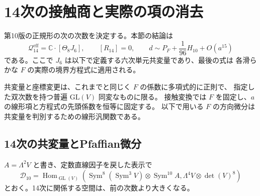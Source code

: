 \clearpage
\section{14次の接触商と実際の項の消去}
\label{sec:contact-fourteen}

第10版の正規形の次の次数を決定する。本節の結論は
\[
 \mathcal Q^{\mathrm{eff}}_{14}=\mathbb C\cdot[\Theta_8J_6],\qquad
 [R_{14}]=0,\qquad
 d\sim P_F+\frac1{96}H_{10}+O(a^{15})
\]
である。ここで $J_6$ は以下で定義する六次単元共変量であり、最後の式は
各滑らかな $F$ の実際の境界方程式に適用される。

共変量と座標変更は、これまでと同じく $F$ の係数に多項式的に正則で、
指定した双次数を持つ普遍 $\mathrm{GL}(V)$ 同変なものに限る。
接触変換では $F$ を固定し、$a$ の線形項と方程式の先頭係数を恒等に固定する。
以下で用いる $F$ の方向微分は共変量を判別するための線形汎関数である。

\subsection{14次の共変量とPfaffian微分}
\label{subsec:v11-fourteenth-characters}

$A=\Lambda^2V$ と書き、定数直線因子を戻した表示で
\[
 \mathcal D_{10}=\operatorname{Hom}_{\operatorname{GL}(V)}
 \left(\operatorname{Sym}^8(\operatorname{Sym}^3V)
       \otimes\operatorname{Sym}^{10}A,
       \Lambda^4V\otimes\det(V)^8\right)
\]
とおく。14次に関係する空間は、前の次数より大きくなる。

